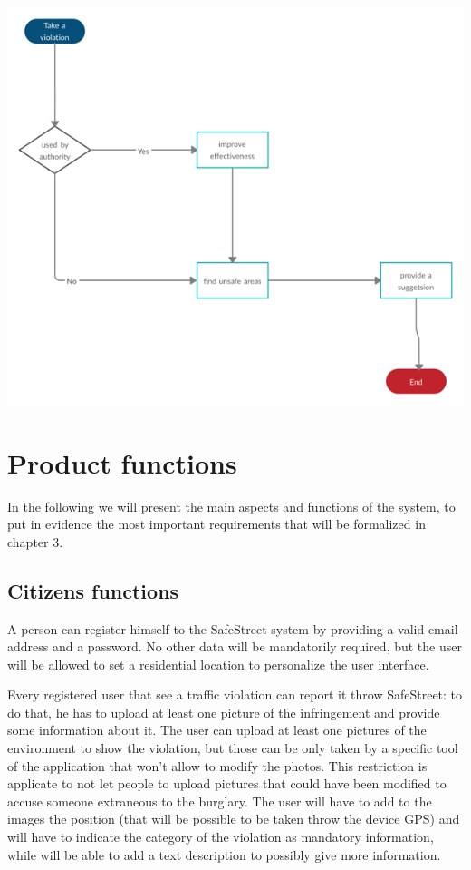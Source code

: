 \documentclass[../RASD.tex]{subfiles}
\begin{document}
    \begin{center}
        \includegraphics{assets/buildStatistics.png}\\
    \end{center}
    \section{Product functions}\label{sec:product-functions}
    In the following we will present the main aspects and functions of the system, to put in evidence the most important requirements that will be formalized in chapter 3.
    \subsection{Citizens functions}\label{subsec:citizen-functions}
    A person can register himself to the SafeStreet system by providing a valid email address and a password. No other data will be mandatorily required, but the user will be allowed to set a residential location to personalize the user interface.

    Every registered user that see a traffic violation can report it throw SafeStreet: to do that, he has to upload at least one picture of the infringement and provide some information about it. The user can upload at least one pictures of the environment to show the violation, but those can be only taken by a specific tool of the application that won't allow to modify the photos. This restriction is applicate to not let people to upload pictures that could have been modified to accuse someone extraneous to the burglary. The user will have to add to the images the position (that will be possible to be taken throw the device GPS) and will have to indicate the category of the violation as mandatory information, while will be able to add a text description to possibly give more information.
\end{document}
